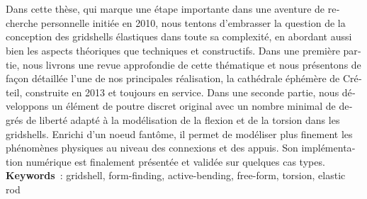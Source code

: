 \begin{otherlanguage}{french}
\\
\\
Dans cette thèse, qui marque une étape importante dans une aventure de recherche personnelle initiée en 2010, nous tentons d'embrasser la question de la conception des gridshells élastiques dans toute sa complexité, en abordant aussi bien les aspects théoriques que techniques et constructifs. Dans une première partie, nous livrons une revue approfondie de cette thématique et nous présentons de façon détaillée l'une de nos principales réalisation, la cathédrale éphémère de Créteil, construite en 2013 et toujours en service. Dans une seconde partie, nous développons un élément de poutre discret original avec un nombre minimal de degrés de liberté adapté à la modélisation de la flexion et de la torsion dans les gridshells. Enrichi d'un noeud fantôme, il permet de modéliser plus finement les phénomènes physiques au niveau des connexions et des appuis. Son implémentation numérique est finalement présentée et validée sur quelques cas types.
%
%
%
%
%
%
%
%
%
%
%
%
%
%
%
%
%
%
%
%
\vspace{12pt}\\
\textbf{Keywords}~: gridshell, form-finding, active-bending, free-form, torsion, elastic rod
\end{otherlanguage}

